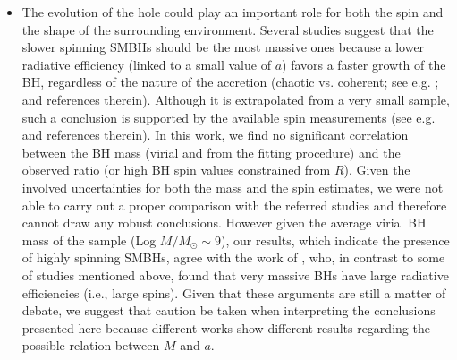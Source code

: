 \documentclass[]{aa}
\begin{document}
\begin{itemize}
	\item The evolution of the hole could play an important role for both the spin and the shape of the surrounding environment. Several studies suggest that the slower spinning SMBHs should be the most massive ones because a lower radiative efficiency (linked to a small value of $a$) favors a faster growth of the BH, regardless of the nature of the accretion (chaotic vs. coherent; see e.g. \citealt{Campitib}; \citealt{Zubo} and references therein). Although it is extrapolated from a very small sample, such a conclusion is supported by the available spin measurements (see e.g. \citealt{Rey} and references therein). In this work, we find no significant correlation between the BH mass (virial and from the fitting procedure) and the observed ratio (or high BH spin values constrained from $R$). Given the involved uncertainties for both the mass and the spin estimates, we were not able to carry out a proper comparison with the referred studies and therefore cannot draw any robust conclusions. However given the average virial BH mass of the sample (Log $M/M_{\odot} \sim 9$), our results, which indicate the presence of highly spinning SMBHs, agree with the work of \citet{Trak}, who, in contrast to some of studies mentioned above, found that very massive BHs have large radiative efficiencies (i.e., large spins). Given that these arguments are still a matter of debate, we suggest that caution be taken when interpreting the conclusions presented here because different works show different results regarding the possible relation between $M$ and $a$.
	

\end{itemize}
\end{document}
